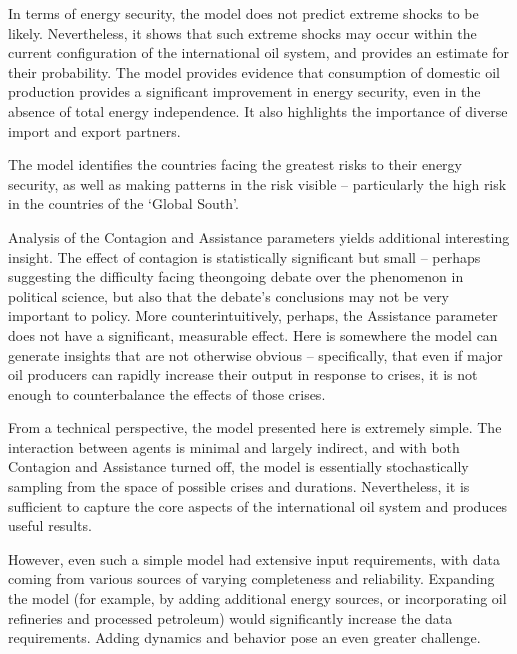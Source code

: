 \documentclass{article}
\begin{document}
In terms of energy security, the model does not predict extreme shocks to be likely. Nevertheless, it shows that such extreme shocks may occur within the current configuration of the international oil system, and provides an estimate for their probability. The model provides evidence that consumption of domestic oil production provides a significant improvement in energy security, even in the absence of total energy independence. It also highlights the importance of diverse import and export partners. 

The model identifies the countries facing the greatest risks to their energy security, as well as making patterns in the risk visible -- particularly the high risk in the countries of the `Global South'. 

Analysis of the Contagion and Assistance parameters yields additional interesting insight. The effect of contagion is statistically significant but small -- perhaps suggesting the difficulty facing theongoing debate over the phenomenon in political science, but also that the debate's conclusions may not be very important to policy. More counterintuitively, perhaps, the Assistance parameter does not have a significant, measurable effect. Here is somewhere the model can generate insights that are not otherwise obvious -- specifically, that even if major oil producers can rapidly increase their output in response to crises, it is not enough to counterbalance the effects of those crises. 

From a technical perspective, the model presented here is extremely simple. The interaction between agents is minimal and largely indirect, and with both Contagion and Assistance turned off, the model is essentially stochastically sampling from the space of possible crises and durations. Nevertheless, it is sufficient to capture the core aspects of the international oil system and produces useful results. 

However, even such a simple model had extensive input requirements, with data coming from various sources of varying completeness and reliability. Expanding the model (for example, by adding additional energy sources, or incorporating oil refineries and processed petroleum) would significantly increase the data requirements. Adding dynamics and behavior pose an even greater challenge. 




\end{document}
